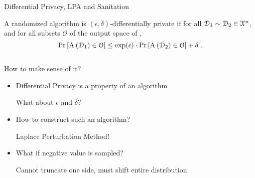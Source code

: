 	\begin{frame}{Differential Privacy, LPA and Sanitation}

		\begin{definition}
			\justify%

			A randomized algorithm  is $(\epsilon, \delta)$-differentially private if for all $\mathcal{D}_1 \sim \mathcal{D}_2 \in \mathcal{X}^{n}$, and for all subsets $\mathcal{O}$ of the output space of ,
			\[
				\probability{ \algo{A}{ \database_1 } \in \mathcal{O} } \leq \exp(\epsilon) \cdot \probability{ \algo{A}{ \database_2 } \in \mathcal{O} } + \delta \; .
			\]
		\end{definition}

		\pause%

		\begin{columns}[T,onlytextwidth]

				\begin{block}{How to make sense of it?}
					\begin{itemize}
						\item<2->
							Differential Privacy is a property of an algorithm \\
							\begin{small}
								\indent{} What about $\epsilon$ and $\delta$?
							\end{small}
						\item<3->
							How to construct such an algorithm? \\
							\begin{small}
								\indent{} Laplace Perturbation Method!
							\end{small}
						\item<4->
							What if negative value is sampled? \\
							\begin{small}
								\indent{} Cannot truncate one side, must shift entire distribution
							\end{small}
					\end{itemize}
				\end{block}


				\centering

		\end{columns}

	\end{frame}

